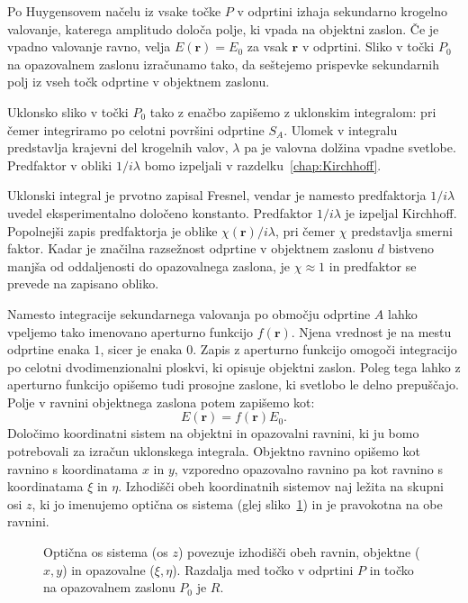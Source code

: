 Po Huygensovem načelu
iz vsake točke $P$ v odprtini izhaja sekundarno krogelno valovanje, 
katerega amplitudo določa polje, ki vpada na objektni zaslon. Če je vpadno valovanje
ravno, velja $E(\mathbf{r}) = E_0$ za vsak $\mathbf{r}$ v odprtini. Sliko
v točki $P_0$  na opazovalnem zaslonu izračunamo tako, da seštejemo prispevke sekundarnih
polj iz vseh točk odprtine v objektnem zaslonu.

Uklonsko sliko v točki $P_0$ tako z enačbo zapišemo z 
uklonskim integralom:
pri čemer integriramo po celotni površini odprtine $S_A$. Ulomek v integralu predstavlja
krajevni del krogelnih valov, $\lambda$ pa je valovna dolžina vpadne svetlobe. Predfaktor
v obliki $1/i\lambda$ bomo izpeljali v razdelku~\ref{chap:Kirchhoff}.
\begin{remark}
Uklonski integral je prvotno zapisal Fresnel, vendar je namesto predfaktorja 
$1/i\lambda$ uvedel eksperimentalno določeno konstanto. Predfaktor $1/i\lambda$ je 
izpeljal Kirchhoff. Popolnejši zapis predfaktorja je oblike $ \chi(\mathbf{r})/i\lambda$,
pri čemer $\chi$ predstavlja smerni faktor. Kadar je značilna razsežnost odprtine v 
objektnem zaslonu $d$ bistveno manjša od oddaljenosti do opazovalnega zaslona, 
je $\chi \approx 1$ in predfaktor se prevede na zapisano obliko. 
\end{remark}

Namesto integracije sekundarnega valovanja po območju odprtine $A$ lahko vpeljemo
tako imenovano aperturno funkcijo $f(\mathbf{r})$.
Njena vrednost je na mestu odprtine enaka $1$,
sicer je enaka $0$. Zapis z aperturno funkcijo omogoči integracijo po celotni dvodimenzionalni
ploskvi, ki opisuje objektni zaslon. Poleg tega lahko z aperturno funkcijo opišemo 
tudi prosojne zaslone, ki svetlobo le delno prepuščajo. 
Polje v ravnini objektnega zaslona potem zapišemo kot:
\begin{equation}
E(\mathbf{r}) = f(\mathbf{r})E_0.
\label{eq:05_02}
\end{equation}
Določimo koordinatni sistem na objektni in opazovalni ravnini, ki ju bomo potrebovali
za izračun uklonskega integrala. Objektno ravnino
opišemo kot ravnino s koordinatama $x$ in $y$, vzporedno opazovalno ravnino pa kot ravnino
s koordinatama $\xi$ in $\eta$. Izhodišči obeh koordinatnih sistemov naj ležita 
na skupni osi $z$, ki jo imenujemo optična os sistema (glej sliko~\ref{fig:05_koordinate})
in je pravokotna na obe ravnini.
\begin{figure}[ht]
\centering
\def\svgwidth{120truemm} 

\caption{Optična os sistema (os $z$) povezuje izhodišči obeh ravnin, objektne ($x,y$) in 
opazovalne ($\xi, \eta$). Razdalja med točko v odprtini $P$ in točko na opazovalnem zaslonu $P_0$
je $R$.}
\label{fig:05_koordinate}
\end{figure}

